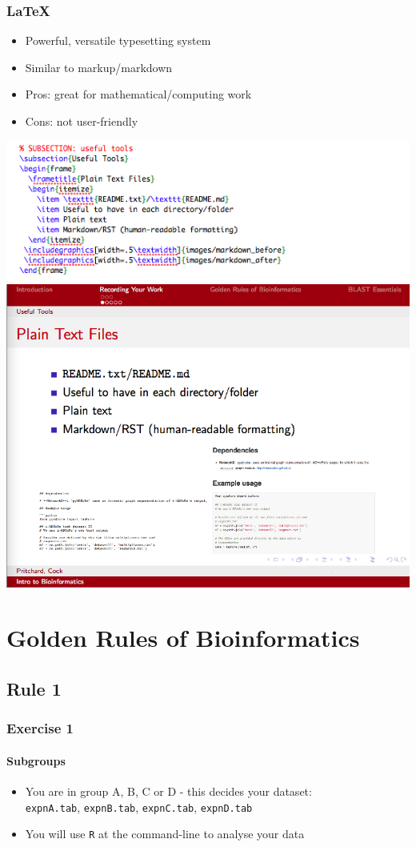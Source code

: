 \documentclass[table]{beamer}
\begin{document}
   \begin{frame}
     \frametitle{\LaTeX}
     \begin{itemize}
       \item Powerful, versatile typesetting system
       \item Similar to markup/markdown
       \item Pros: great for mathematical/computing work
       \item Cons: not user-friendly
     \end{itemize}
     \begin{center}
        \includegraphics[width=.35\textwidth]{images/latex_before}
        \includegraphics[width=.35\textwidth]{images/latex_after}     
     \end{center}
   \end{frame}

  \section{Golden Rules of Bioinformatics}
  
  \subsection{Rule 1}
  \begin{frame}
    \frametitle{Exercise 1}
    \framesubtitle{Subgroups}
    \begin{itemize}
      \item You are in group A, B, C or D - this decides your dataset: \\
      \texttt{expnA.tab}, \texttt{expnB.tab}, \texttt{expnC.tab}, \texttt{expnD.tab}
      \item You will use \texttt{R} at the command-line to analyse your data
    \end{itemize}
  \end{frame}
  
\end{document}
